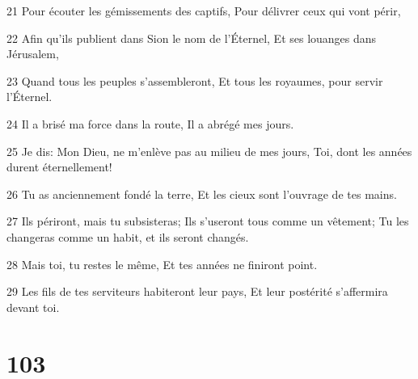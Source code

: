 \par 21 Pour écouter les gémissements des captifs, Pour délivrer ceux qui vont périr,
\par 22 Afin qu'ils publient dans Sion le nom de l'Éternel, Et ses louanges dans Jérusalem,
\par 23 Quand tous les peuples s'assembleront, Et tous les royaumes, pour servir l'Éternel.
\par 24 Il a brisé ma force dans la route, Il a abrégé mes jours.
\par 25 Je dis: Mon Dieu, ne m'enlève pas au milieu de mes jours, Toi, dont les années durent éternellement!
\par 26 Tu as anciennement fondé la terre, Et les cieux sont l'ouvrage de tes mains.
\par 27 Ils périront, mais tu subsisteras; Ils s'useront tous comme un vêtement; Tu les changeras comme un habit, et ils seront changés.
\par 28 Mais toi, tu restes le même, Et tes années ne finiront point.
\par 29 Les fils de tes serviteurs habiteront leur pays, Et leur postérité s'affermira devant toi.

\chapter{103}

